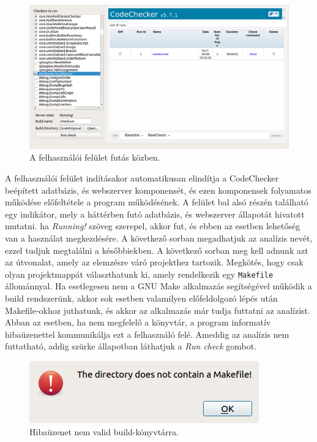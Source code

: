 \documentclass[a4paper,12pt]{report}
\begin{document}
\begin{figure}[h]
\caption{A felhasználói felület futás közben.}
\centering
\includegraphics[scale=0.36]{ui.png}
\end{figure}

A felhasználói felület indításakor automatikusan elindítja a CodeChecker beépített adatbázis, és webszerver komponensét, és ezen komponensek folyamatos működése előfeltétele a program működésének. A felület bal alsó részén található egy indikátor, mely a háttérben futó adatbázis, és webszerver állapotát hivatott mutatni. ha \emph{Running!} szöveg szerepel, akkor fut, és ebben az esetben lehetőség van a használat megkezdésére. A következő sorban megadhatjuk az analízis nevét, ezzel tudjuk megtalálni a későbbiekben. A következő sorban meg kell adnunk azt az útvonalat, amely az elemzésre váró projekthez tartozik. Megkötés, hogy csak olyan projektmappát választhatunk ki, amely rendelkezik egy \texttt{Makefile} állománnyal. Ha esetlegesen nem a GNU Make alkalmazás segítségével működik a build rendszerünk, akkor sok esetben valamilyen előfeldolgozó lépés után Makefile-okhoz juthatunk, és akkor az alkalmazás már tudja futtatni az analízist. Abban az esetben, ha nem megfelelő a könyvtár, a program informatív hibaüzenettel kommunikálja ezt a felhasználó felé. Ameddig az analízis nem futtatható, addig szürke állapotban láthatjuk a \emph{Run check} gombot.


\begin{figure}[h]
\caption{Hibaüzenet nem valid build-könyvtárra.}
\centering
\includegraphics[scale=0.8]{build_dir_error.png}
\end{figure}
\end{document}

